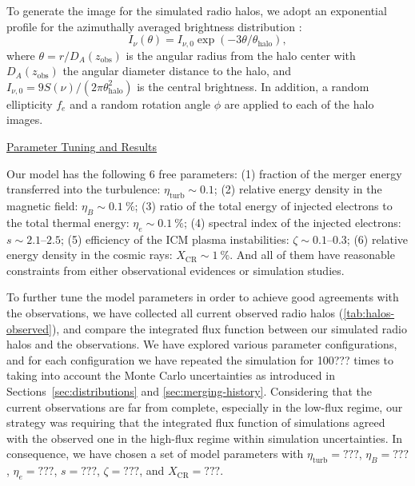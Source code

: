 \documentclass[modern]{aastex61}
\newcommand{\R}[1]{\mathrm{#1}}
\begin{document}
To generate the image for the simulated radio halos, we adopt an exponential
profile for the azimuthally averaged brightness distribution \citep{murgia2009}:
\begin{equation}
  \label{eq:halo-profile}
  I_{\nu}(\theta) = I_{\nu,0} \exp(-3 \theta / \theta_{\R{halo}}),
\end{equation}
where $\theta = r / D_A(z_{\R{obs}})$ is the angular radius from the halo
center with $D_A(z_{\R{obs}})$ the angular diameter distance to the halo,
and $I_{\nu,0} = 9 S(\nu) / (2\pi \theta^2_{\R{halo}})$ is the central
brightness.
In addition, a random ellipticity $f_e$ and a random rotation angle
$\phi$ are applied to each of the halo images.

\vspace{1ex}
\uline{Parameter Tuning and Results}

Our model has the following 6 free parameters:
(1) fraction of the merger energy transferred into the turbulence:
$\eta_{\R{turb}} \sim 0.1$;
(2) relative energy density in the magnetic field:
$\eta_B \sim \SI{0.1}{\percent}$;
(3) ratio of the total energy of injected electrons to the total thermal
energy: $\eta_e \sim \SI{0.1}{\percent}$;
(4) spectral index of the injected electrons: $s \sim \numrange{2.1}{2.5}$;
(5) efficiency of the ICM plasma instabilities:
$\zeta \sim \numrange{0.1}{0.3}$;
(6) relative energy density in the cosmic rays:
$X_{\R{CR}} \sim \SI{1}{\percent}$.
And all of them have reasonable constraints from either observational
evidences or simulation studies.

To further tune the model parameters in order to achieve good agreements
with the observations, we have collected all current observed radio halos
(\autoref{tab:halos-observed}), and compare the integrated flux function
between our simulated radio halos and the observations.
We have explored various parameter configurations,
and for each configuration we have repeated the simulation for 100??? times
to taking into account the Monte Carlo uncertainties as introduced in
Sections~\ref{sec:distributions} and \ref{sec:merging-history}.
Considering that the current observations are far from complete,
especially in the low-flux regime, our strategy was requiring that the
integrated flux function of simulations agreed with the observed one
in the high-flux regime within simulation uncertainties.
In consequence, we have chosen a set of model parameters with
$\eta_{\R{turb}} = ???$, $\eta_B = ???$, $\eta_e = ???$, $s = ???$,
$\zeta = ???$, and $X_{\R{CR}} = ???$.
\end{document}
